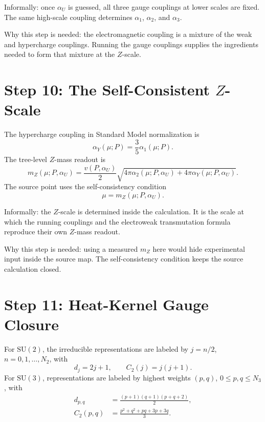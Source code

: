 \documentclass[11pt]{article}
\theoremstyle{remark}
\newcommand{\SU}{\mathrm{SU}}
\begin{document}
Informally: once \(\alpha_U\) is guessed, all three gauge couplings at lower scales are fixed. The same high-scale coupling determines \(\alpha_1\), \(\alpha_2\), and \(\alpha_3\).

Why this step is needed: the electromagnetic coupling is a mixture of the weak and hypercharge couplings. Running the gauge couplings supplies the ingredients needed to form that mixture at the \(Z\)-scale.

\section{Step 10: The Self-Consistent \(Z\)-Scale}

The hypercharge coupling in Standard Model normalization is
\begin{equation}
\alpha_Y(\mu;P)=\frac{3}{5}\alpha_1(\mu;P).
\label{eq:alphaY}
\end{equation}
The tree-level \(Z\)-mass readout is
\begin{equation}
m_Z(\mu;P,\alpha_U)
=
\frac{v(P,\alpha_U)}{2}
\sqrt{4\pi\alpha_2(\mu;P,\alpha_U)+4\pi\alpha_Y(\mu;P,\alpha_U)}.
\label{eq:mZtree}
\end{equation}
The source point uses the self-consistency condition
\begin{equation}
\mu=m_Z(\mu;P,\alpha_U).
\label{eq:mZfixed}
\end{equation}

Informally: the \(Z\)-scale is determined inside the calculation. It is the scale at which the running couplings and the electroweak transmutation formula reproduce their own \(Z\)-mass readout.

Why this step is needed: using a measured \(m_Z\) here would hide experimental input inside the source map. The self-consistency condition keeps the source calculation closed.

\section{Step 11: Heat-Kernel Gauge Closure}

For \(\SU(2)\), the irreducible representations are labeled by \(j=n/2\), \(n=0,1,\ldots,N_2\), with
\begin{equation}
d_j=2j+1,
\qquad
C_2(j)=j(j+1).
\label{eq:su2rep}
\end{equation}
For \(\SU(3)\), representations are labeled by highest weights \((p,q)\), \(0\le p,q\le N_3\), with
\begin{align}
d_{p,q}&=\frac{(p+1)(q+1)(p+q+2)}{2},
\label{eq:su3dim}\\
C_2(p,q)&=\frac{p^2+q^2+pq+3p+3q}{3}.
\label{eq:su3casimir}
\end{align}
\end{document}
